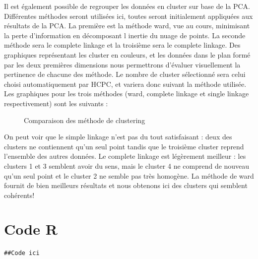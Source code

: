 \documentclass[11pt,a4paper]{article}
\begin{document}
Il est également possible de regrouper les données en cluster sur base de la PCA. Différentes méthodes seront utilisées ici, toutes seront initialement appliquées aux résultats de la PCA. La première est la méthode ward, vue au cours, minimisant la perte d'information en décomposant l inertie du nuage de points. La seconde méthode sera le complete linkage et la troisième sera le complete linkage. Des graphiques représentant les cluster en couleurs, et les données dans le plan formé par les deux premières dimensions nous permettrons d'évaluer visuellement la pertinence de chacune des méthode. Le nombre de cluster  sélectionné sera celui choisi automatiquement par HCPC, et variera donc suivant la méthode utilisée. Les graphiques pour les trois méthodes (ward, complete linkage et single linkage respectivement) sont les suivants :




\begin{figure}[t]
\centering
{}

\caption{Comparaison des méthode de clustering}
\label{fig:whatever}
\end{figure}
\newpage

On peut voir que le simple linkage n'est pas du tout satisfaisant : deux des clusters ne contiennent qu'un seul point tandis que le troisième cluster reprend l'ensemble des autres données. Le complete linkage est légèrement meilleur : les clusters 1 et 3 semblent avoir du sens, mais le cluster 4 ne comprend de nouveau qu'un seul point et le cluster 2 ne semble pas très homogène. La méthode de ward fournit de bien meilleurs résultats et nous obtenons ici des clusters qui semblent cohérents!

\bigskip
\section{Code R}
\lstset{language=R}
\begin{lstlisting}[breaklines]
##Code ici
\end{lstlisting}
\end{document}
